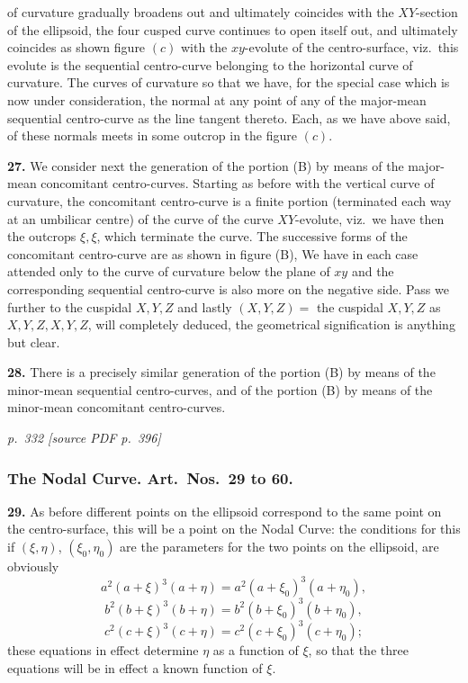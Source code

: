 \documentclass[11pt,a4paper]{article}
\newcommand{\pagemarker}[2]{\par\bigskip\noindent\textit{p.~#1 [source PDF p.~#2]}\par\smallskip}
\begin{document}
of curvature gradually broadens out and ultimately coincides with the $XY$-section of the ellipsoid, the four cusped curve continues to open itself out, and ultimately coincides as shown figure $(c)$ with the $xy$-evolute of the centro-surface, viz.\ this evolute is the sequential centro-curve belonging to the horizontal curve of curvature. The curves of curvature so that we have, for the special case which is now under consideration, the normal at any point of any of the major-mean sequential centro-curve as the line tangent thereto. Each, as we have above said, of these normals meets in some outcrop in the figure $(c)$.

\textbf{27.} We consider next the generation of the portion (B) by means of the major-mean concomitant centro-curves. Starting as before with the vertical curve of curvature, the concomitant centro-curve is a finite portion (terminated each way at an umbilicar centre) of the curve of the curve $XY$-evolute, viz.\ we have then the outcrops $\xi, \xi$, which terminate the curve. The successive forms of the concomitant centro-curve are as shown in figure (B), We have in each case attended only to the curve of curvature below the plane of $xy$ and the corresponding sequential centro-curve is also more on the negative side. Pass we further to the cuspidal $X, Y, Z$ and lastly $(X, Y, Z) = $ the cuspidal $X, Y, Z$ as $X, Y, Z, X, Y, Z$, will completely deduced, the geometrical signification is anything but clear.

\textbf{28.} There is a precisely similar generation of the portion (B) by means of the minor-mean sequential centro-curves, and of the portion (B) by means of the minor-mean concomitant centro-curves.

\clearpage

\pagemarker{332}{396}

\subsubsection*{The Nodal Curve. Art.\ Nos.\ 29 to 60.}

\textbf{29.} As before different points on the ellipsoid correspond to the same point on the centro-surface, this will be a point on the Nodal Curve: the conditions for this if $(\xi,\eta)$, $(\xi_0, \eta_0)$ are the parameters for the two points on the ellipsoid, are obviously
\[
a^2(a + \xi)^3(a + \eta) = a^2(a + \xi_0)^3(a + \eta_0),
\]
\[
b^2(b + \xi)^3(b + \eta) = b^2(b + \xi_0)^3(b + \eta_0),
\]
\[
c^2(c + \xi)^3(c + \eta) = c^2(c + \xi_0)^3(c + \eta_0);
\]
these equations in effect determine $\eta$ as a function of $\xi$, so that the three equations will be in effect a known function of $\xi$.
\end{document}

